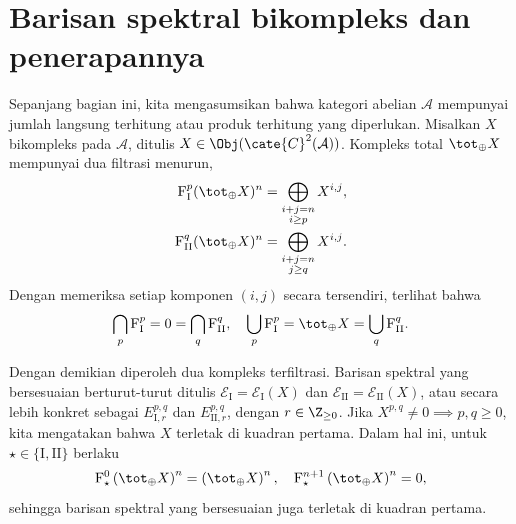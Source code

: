 
\section{Barisan spektral bikompleks dan penerapannya}
\label{sec:double-cplx-ss}
\hypertarget{o014.aljabr2.chapter5.bicomplex-spectral-sequences-applications}{ }

Sepanjang bagian ini, kita mengasumsikan bahwa kategori abelian $\mathcal{A}$
mempunyai jumlah langsung terhitung atau produk terhitung yang diperlukan. Misalkan
$X$ bikompleks pada $\mathcal{A}$, ditulis
$X\in\Obj(\cate{C}^2(\mathcal{A}))$. Kompleks total $\tot_{\oplus}X$
mempunyai dua filtrasi menurun,
\begin{align*}
	\mathrm{F}^p_{\mathrm{I}} (\tot_{\oplus} X)^n & = \bigoplus_{\substack{i+j=n \\ i \geq p}} X^{i, j}, \\
	\mathrm{F}^q_{\mathrm{II}} (\tot_{\oplus} X)^n & = \bigoplus_{\substack{i+j=n \\ j \geq q}} X^{i, j} .
\end{align*}
Dengan memeriksa setiap komponen $(i,j)$ secara tersendiri, terlihat bahwa
\[ \bigcap_p \mathrm{F}^p_{\mathrm{I}} = 0 = \bigcap_q \mathrm{F}^q_{\mathrm{II}}, \quad \bigcup_p \mathrm{F}^p_{\mathrm{I}} = \tot_{\oplus} X = \bigcup_q \mathrm{F}^q_{\mathrm{II}}. \]

Dengan demikian diperoleh dua kompleks terfiltrasi. Barisan spektral yang
bersesuaian berturut-turut ditulis
$\mathscr{E}_{\mathrm{I}}=\mathscr{E}_{\mathrm{I}}(X)$ dan
$\mathscr{E}_{\mathrm{II}}=\mathscr{E}_{\mathrm{II}}(X)$, atau secara lebih
konkret sebagai $E_{\mathrm{I},r}^{p,q}$ dan
$E_{\mathrm{II},r}^{p,q}$, dengan $r\in\Z_{\geq0}$. Jika
$X^{p,q}\neq0\implies p,q\geq0$, kita mengatakan bahwa $X$ terletak di
kuadran pertama. Dalam hal ini, untuk
$\star\in\{\mathrm{I},\mathrm{II}\}$ berlaku
\[ \mathrm{F}_\star^0 \left(\tot_{\oplus} X \right)^n = \left(\tot_{\oplus} X\right)^n, \quad \mathrm{F}_\star^{n+1} \left(\tot_{\oplus} X \right)^n = 0 , \]
sehingga barisan spektral yang bersesuaian juga terletak di kuadran pertama.

